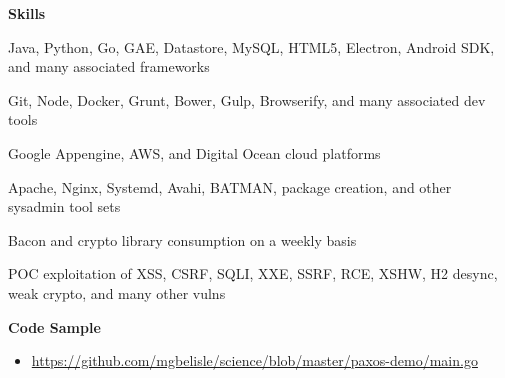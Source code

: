 \documentclass[10pt, a4paper]{article}
\begin{document}
\textbf{Skills}
\begin{itemize*}
  \item Java, Python, Go, GAE, Datastore, MySQL, HTML5, Electron, Android SDK, and many associated frameworks
  \item Git, Node, Docker, Grunt, Bower, Gulp, Browserify, and many associated dev tools
  \item Google Appengine, AWS, and Digital Ocean cloud platforms
  \item Apache, Nginx, Systemd, Avahi, BATMAN, package creation, and other sysadmin tool sets
  \item Bacon and crypto library consumption on a weekly basis
  \item POC exploitation of XSS, CSRF, SQLI, XXE, SSRF, RCE, XSHW, H2 desync, weak crypto, and many other vulns
\end{itemize*}
\textbf{Code Sample}
\begin{itemize}
  \item[] \url{https://github.com/mgbelisle/science/blob/master/paxos-demo/main.go}
\end{itemize}
\end{document}
